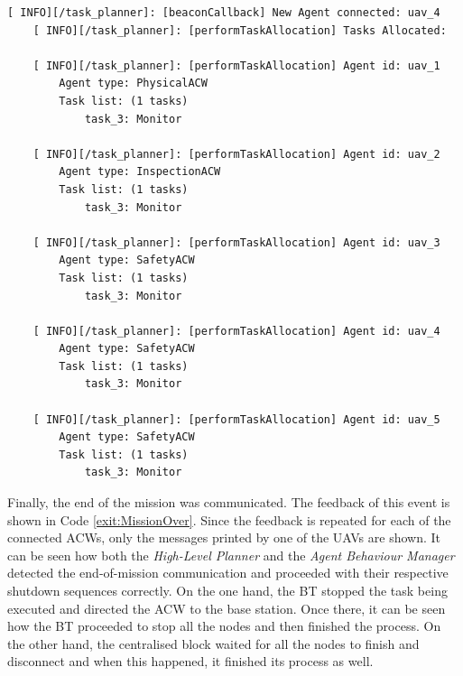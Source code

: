 \begin{lstlisting}[caption={Feedback messages printed after an \gls{ACW} reconnects}, breaklines=true, label=exit:Reconnection]
    [ INFO][/task_planner]: [beaconCallback] New Agent connected: uav_4
    [ INFO][/task_planner]: [performTaskAllocation] Tasks Allocated:
    
    [ INFO][/task_planner]: [performTaskAllocation] Agent id: uav_1
        Agent type: PhysicalACW
        Task list: (1 tasks)
            task_3: Monitor
    
    [ INFO][/task_planner]: [performTaskAllocation] Agent id: uav_2
        Agent type: InspectionACW
        Task list: (1 tasks)
            task_3: Monitor
    
    [ INFO][/task_planner]: [performTaskAllocation] Agent id: uav_3
        Agent type: SafetyACW
        Task list: (1 tasks)
            task_3: Monitor
    
    [ INFO][/task_planner]: [performTaskAllocation] Agent id: uav_4
        Agent type: SafetyACW
        Task list: (1 tasks)
            task_3: Monitor
    
    [ INFO][/task_planner]: [performTaskAllocation] Agent id: uav_5
        Agent type: SafetyACW
        Task list: (1 tasks)
            task_3: Monitor
\end{lstlisting}

Finally, the end of the mission was communicated. The feedback of this event is shown in Code \ref{exit:MissionOver}. Since the feedback is repeated for each of the connected \glspl{ACW}, only the messages printed by one of the \glspl{UAV} are shown. It can be seen how both the \emph{High-Level Planner} and the \emph{Agent Behaviour Manager} detected the end-of-mission communication and proceeded with their respective shutdown sequences correctly. On the one hand, the \gls{BT} stopped the task being executed and directed the \gls{ACW} to the base station. Once there, it can be seen how the \gls{BT} proceeded to stop all the nodes and then finished the process. On the other hand, the centralised block waited for all the nodes to finish and disconnect and when this happened, it finished its process as well. 


